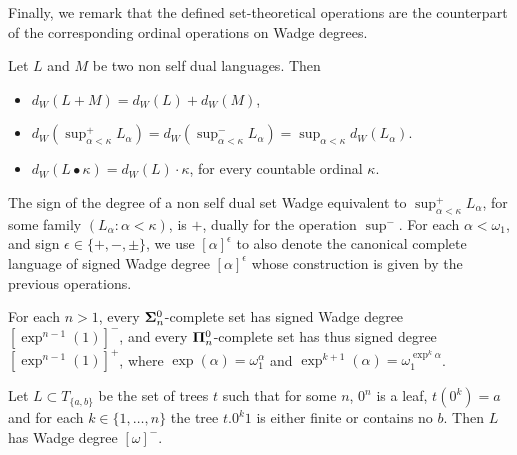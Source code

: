 Finally, we remark that  the defined set-theoretical operations are the counterpart of the corresponding ordinal operations on Wadge degrees.

\begin{lemma}
\label{r_mult}
Let $L$ and $ M$ be two non self dual languages. Then 
\begin{itemize}
\item $d_W(L+M)=d_W(L)+d_W(M)$, 
\item$d_W(\sup^+ _{\alpha < \kappa} L_\alpha)= d_W(\sup^- _{\alpha < \kappa} L_\alpha)=\sup_{\alpha < \kappa}d_W( L_\alpha)$.
\item $d_W(L \bullet \kappa)= d_W(L) \cdot \kappa$, for every countable ordinal $\kappa$.
\end{itemize}
\end{lemma}

The sign of the degree of a non self dual set Wadge equivalent 
to $\sup^+ _{\alpha < \kappa} L_\alpha$, for some   family $(L_\alpha: \alpha < \kappa)$, is $+$, dually for the operation $\sup^-$. 
For each $\alpha < \omega_1$, and sign $\epsilon \in \{+,-,\pm\}$, we use  $[\alpha]^\epsilon$ to also denote the canonical complete language of signed Wadge degree $[\alpha]^\epsilon$ whose construction is given by the previous operations.

For each $n>1$, every ${\bf \Sigma}^0_n$-complete set has signed Wadge degree $[\exp^{n-1}(1)]^-$, and every ${\bf \Pi}^0_n$-complete set has thus signed degree $[\exp^{n-1}(1)]^+$, where $\exp(\alpha) = \omega_1^\alpha$ and $\exp^{k+1}(\alpha) = \omega_1^{\exp^k{\alpha}}$.

\begin{proposition}
\label{rem:example}
Let $L\subset T_{\{a,b\}}$ be the set of trees $t$ such that for some $n$, $0^n$ is a leaf, $t(0^k)=a$ and for each $k\in \{1, \dots, n\}$ the tree $t.0^k1$ is either finite or contains no $b$. Then $L$ has Wadge degree $[\omega]^-$. 
\end{proposition}

